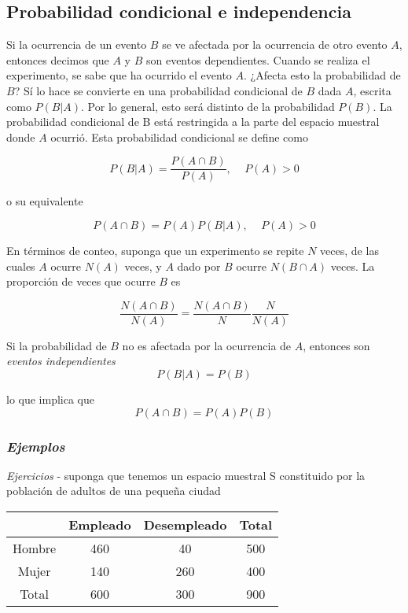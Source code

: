 \documentclass[11pt]{article}
\begin{document}
    \hypertarget{probabilidad-condicional-e-independencia}{%
\subsection{Probabilidad condicional e
independencia}\label{probabilidad-condicional-e-independencia}}

Si la ocurrencia de un evento \(B\) se ve afectada por la ocurrencia de
otro evento \(A\), entonces decimos que \(A\) y \(B\) son eventos
dependientes. Cuando se realiza el experimento, se sabe que ha ocurrido
el evento \(A\). ¿Afecta esto la probabilidad de \(B\)? Sí lo hace se
convierte en una probabilidad condicional de \(B\) dada \(A\), escrita
como \(P (B \vert A)\). Por lo general, esto será distinto de la
probabilidad \(P (B)\). La probabilidad condicional de B está
restringida a la parte del espacio muestral donde \(A\) ocurrió. Esta
probabilidad condicional se define como

\[
P(B\vert A)= \frac{P(A\cap B)}{ P(A)} \text{,        } \quad P(A)>0
\]

o su equivalente

\[
P(A\cap B)= P(A) P(B\vert A)  \text{,        } \quad P(A)>0
\]

En términos de conteo, suponga que un experimento se repite \(N\) veces,
de las cuales \(A\) ocurre \(N (A)\) veces, y \(A\) dado por \(B\)
ocurre \(N (B ∩ A)\) veces. La proporción de veces que ocurre \(B\) es

\[
\frac{N(A\cap B)}{N(A)}= \frac{N(A\cap B)}{N}\frac{ N}{N(A)}
\]

Si la probabilidad de \(B\) no es afectada por la ocurrencia de \(A\),
entonces son \emph{eventos independientes} \[
P(B\vert A)=P(B)
\]

lo que implica que \[
P(A\cap B)=P(A)P(B)
\]

    \hypertarget{ejemplos}{%
\subsubsection{\texorpdfstring{\emph{Ejemplos}}{Ejemplos}}\label{ejemplos}}

\emph{Ejercicios} - suponga que tenemos un espacio muestral S
constituido por la población de adultos de una pequeña ciudad

\begin{longtable}[]{@{}cccc@{}}
\toprule
& Empleado & Desempleado & Total\tabularnewline
\midrule
\endhead
Hombre & 460 & 40 & 500\tabularnewline
Mujer & 140 & 260 & 400\tabularnewline
Total & 600 & 300 & 900\tabularnewline
\bottomrule
\end{longtable}
\end{document}
